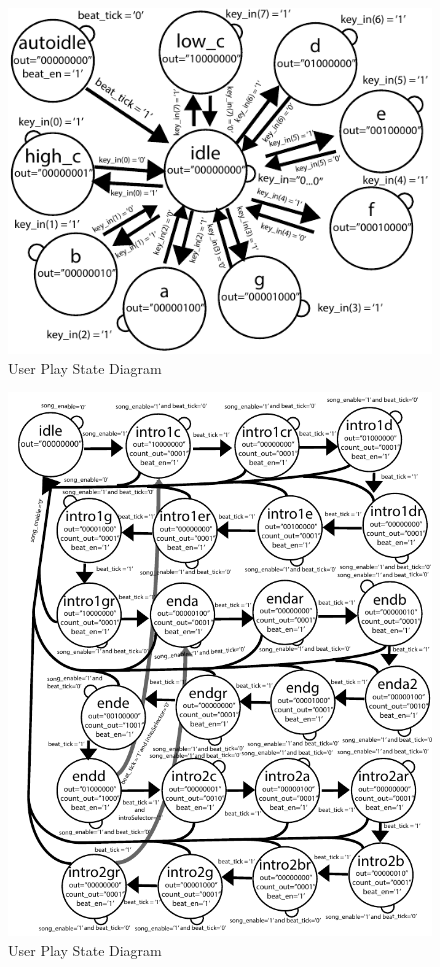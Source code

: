\documentclass{article}
\begin{document}
      \begin{figure}[H]
        \centering
        \includegraphics[width=6in]{img/UserStateDiagram}
        \caption{User Play State Diagram}
      \end{figure}
      \newpage
      \begin{figure}[H]
        \centering
        \includegraphics[width=6.5in]{img/AutoplayStateDiagram}
        \caption{User Play State Diagram}
      \end{figure}
\end{document}
